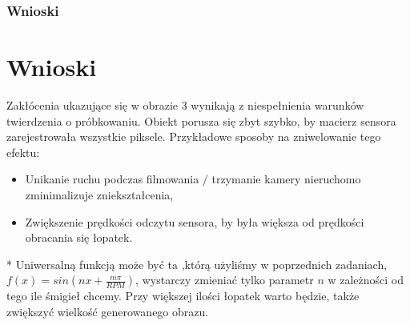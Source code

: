 \documentclass[14pt]{article}
\begin{document}
\subsubsection{Wnioski}

\newpage
\section{Wnioski}
Zakłócenia ukazujące się w obrazie 3 wynikają z 
niespełnienia warunków twierdzenia o próbkowaniu. Obiekt
porusza się zbyt szybko, by macierz sensora zarejestrowała 
wszystkie piksele. Przykładowe sposoby na zniwelowanie 
tego efektu:
\vspace{0.25cm}
\begin{itemize}
    \item Unikanie ruchu podczas filmowania / trzymanie kamery 
    nieruchomo zminimalizuje zniekształcenia,
    \item Zwiększenie prędkości odczytu sensora, by była 
    większa od prędkości obracania się łopatek.
\end{itemize}

\vspace{0.25cm}
* Uniwersalną funkcją może być ta ,którą użyliśmy w poprzednich zadaniach,
$f(x) = sin(nx + \frac{m\pi}{RPM})$, wystarczy zmieniać tylko
parametr $n$ w zależności od tego ile śmigieł chcemy. Przy większej 
ilości łopatek warto będzie, także zwiększyć wielkość generowanego obrazu.
\end{document}
